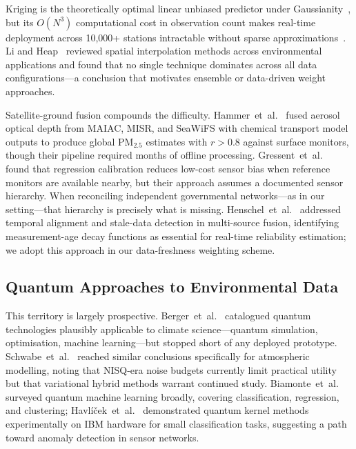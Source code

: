 \documentclass[conference]{IEEEtran}
\begin{document}
Kriging is the theoretically optimal linear unbiased predictor under
Gaussianity~\cite{cressie1990origins}, but its $O(N^3)$ computational
cost in observation count makes real-time deployment across 10,000+
stations intractable without sparse approximations~\cite{krige1951}.
Li and Heap~\cite{li2011review} reviewed spatial interpolation methods
across environmental applications and found that no single technique
dominates across all data configurations---a conclusion that motivates
ensemble or data-driven weight approaches.

Satellite-ground fusion compounds the difficulty.
Hammer~et~al.~\cite{hammer2020global} fused aerosol optical depth from
MAIAC, MISR, and SeaWiFS with chemical transport model outputs to
produce global PM$_{2.5}$ estimates with $r > 0.8$ against surface
monitors, though their pipeline required months of offline processing.
Gressent~et~al.~\cite{gressent2020datafusion} found that regression
calibration reduces low-cost sensor bias when reference monitors are
available nearby, but their approach assumes a documented sensor hierarchy.
When reconciling independent governmental networks---as in our setting---that
hierarchy is precisely what is missing.
Henschel~et~al.~\cite{henschel2018data} addressed temporal alignment and
stale-data detection in multi-source fusion, identifying measurement-age
decay functions as essential for real-time reliability estimation; we adopt
this approach in our data-freshness weighting scheme.

\subsection{Quantum Approaches to Environmental Data}

This territory is largely prospective.
Berger~et~al.~\cite{berger2021quantum} catalogued quantum technologies
plausibly applicable to climate science---quantum simulation, optimisation,
machine learning---but stopped short of any deployed prototype.
Schwabe~et~al.~\cite{schwabe2025opportunities} reached similar conclusions
specifically for atmospheric modelling, noting that NISQ-era noise budgets
currently limit practical utility but that variational hybrid methods
warrant continued study.
Biamonte~et~al.~\cite{biamonte2017quantum} surveyed quantum machine
learning broadly, covering classification, regression, and clustering;
Havl\'{i}\v{c}ek~et~al.~\cite{havlicek2019supervised} demonstrated
quantum kernel methods experimentally on IBM hardware for small classification
tasks, suggesting a path toward anomaly detection in sensor networks.
\end{document}
